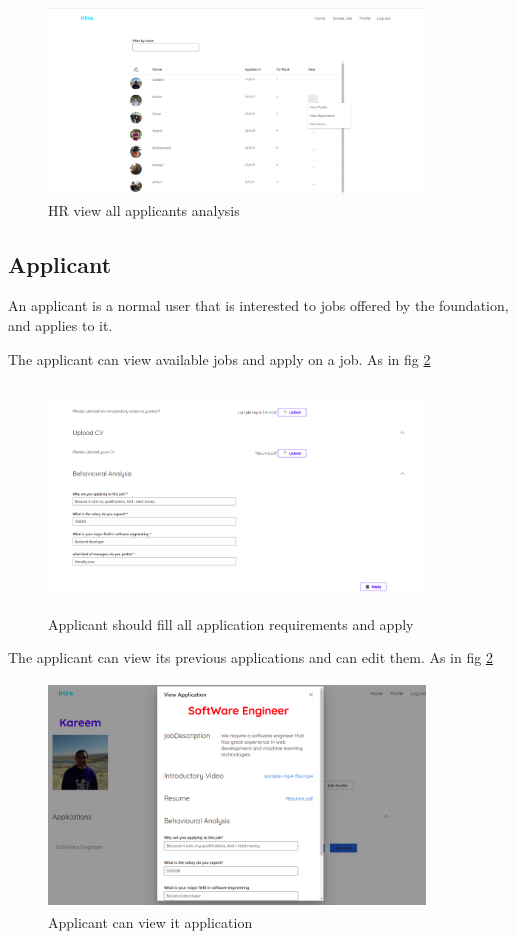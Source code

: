 \begin{figure}[h!]
\centering
\includegraphics[width=10cm,height=5cm, frame]{images/User Interface/view.png}
\caption{HR view all applicants analysis}
\label{fig:hr_view}
\end{figure}


\subsection{Applicant}

An applicant is a normal user that is interested to jobs offered by the foundation, and applies to it.

The applicant can view available jobs and apply on a job. As in fig \ref{fig:applicant_apply}

\begin{figure}[h!]
\centering
\includegraphics[width=10cm,height=6cm, frame]{images/User Interface/applicant_apply.png}
\caption{Applicant should fill all application requirements and apply}
\label{fig:applicant_apply}
\end{figure}

The applicant can view its previous applications and can edit them. As in fig \ref{fig:applicant_apply}

\begin{figure}[h!]
\centering
\includegraphics[width=10cm,height=6cm, frame]{images/User Interface/applicant_view_app.png}
\caption{Applicant can view it application}
\label{fig:applicant_view_app}
\end{figure}


